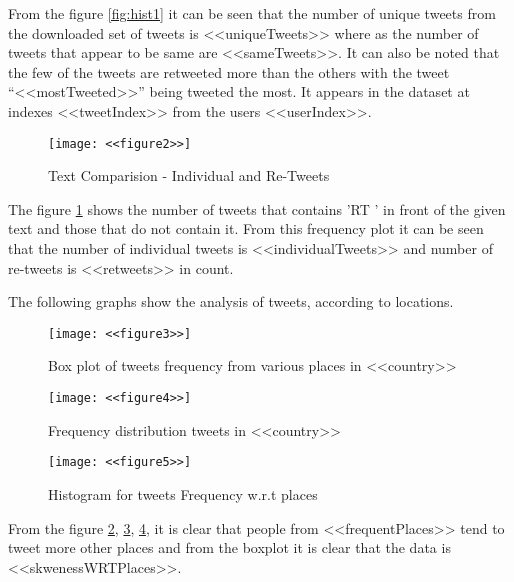 \documentclass[a4paper,12pt, notitlepage]{article}
\begin{document}
\par
From the figure \ref{fig:hist1} it can be seen that the number of unique tweets from the
downloaded set of tweets is <<uniqueTweets>> where as the number of tweets that appear to be same are <<sameTweets>>. It can also be noted that the few of the tweets are retweeted more than the others with the tweet ``<<mostTweeted>>'' being tweeted the most. It appears in the dataset at indexes <<tweetIndex>> from the users <<userIndex>>.

\begin{figure}[!htbp]
    \centering
    \texttt{[image: <<figure2>>]}
    \caption{Text Comparision - Individual and Re-Tweets}
    \label{fig:vbarplot1}
\end{figure}

\par
The figure \ref{fig:vbarplot1} shows the number of tweets that contains 'RT ' in front of the given text and those that do not contain it. From this frequency plot it can be seen
that the number of individual tweets is <<individualTweets>> and number of re-tweets is <<retweets>> in count.

\par
The following graphs show the analysis of tweets, according to locations.

\begin{figure}[!htbp]
    \centering
    \texttt{[image: <<figure3>>]}
    \caption{Box plot of tweets frequency from various places in <<country>> }
    \label{fig:boxplot1}
\end{figure}

\begin{figure}[!htbp]
    \centering
    \texttt{[image: <<figure4>>]}
    \caption{Frequency distribution tweets in <<country>> }
    \label{fig:vbarplot2}
\end{figure}

\begin{figure}[!htbp]
    \centering
    \texttt{[image: <<figure5>>]}
    \caption{Histogram for tweets Frequency w.r.t places}
    \label{fig:hist2}
\end{figure}

\par
From the figure \ref{fig:boxplot1}, \ref{fig:vbarplot2}, \ref{fig:hist2}, it is clear that people from <<frequentPlaces>> tend to tweet more other places and from the boxplot it is clear that the data is <<skwenessWRTPlaces>>.
\end{document}
